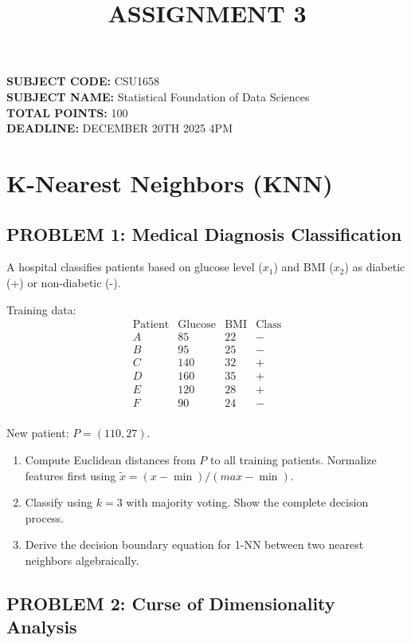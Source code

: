 \documentclass[12pt]{article}
\title{ASSIGNMENT 3}
\author{}
\date{}
\begin{document}
\maketitle

\noindent
\textbf{SUBJECT CODE:} CSU1658 \\
\textbf{SUBJECT NAME:} Statistical Foundation of Data Sciences \\
\textbf{TOTAL POINTS:} 100 \\
\textbf{DEADLINE:} DECEMBER 20TH 2025 4PM

\section*{K-Nearest Neighbors (KNN)}

\subsection*{PROBLEM 1: Medical Diagnosis Classification}

A hospital classifies patients based on glucose level (\(x_1\)) and BMI (\(x_2\)) as diabetic (+) or non-diabetic (-).

Training data:
\[\begin{array}{c|cc|c}
\text{Patient} & \text{Glucose} & \text{BMI} & \text{Class} \\
\hline
A & 85 & 22 & - \\
B & 95 & 25 & - \\
C & 140 & 32 & + \\
D & 160 & 35 & + \\
E & 120 & 28 & + \\
F & 90 & 24 & - \\
\end{array}\]

New patient: \(P = (110, 27)\).

\begin{enumerate}
\item[(a)] Compute Euclidean distances from \(P\) to all training patients. Normalize features first using \(\tilde{x} = (x - \min)/(max - \min)\).
\item[(b)] Classify using \(k=3\) with majority voting. Show the complete decision process.
\item[(c)] Derive the decision boundary equation for 1-NN between two nearest neighbors algebraically.
\end{enumerate}

\subsection*{PROBLEM 2: Curse of Dimensionality Analysis}
\end{document}
